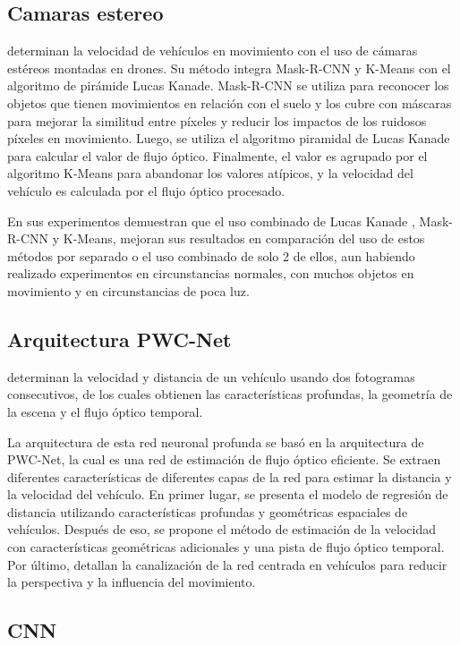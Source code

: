 \subsection{Camaras estereo}

\cite{peng2019Improved} determinan la velocidad de vehículos en movimiento con el uso de cámaras estéreos montadas en drones. Su método integra Mask-R-CNN  y K-Means con el algoritmo de pirámide Lucas Kanade. Mask-R-CNN se utiliza para reconocer los objetos que tienen movimientos en relación con el suelo y los cubre con máscaras para mejorar la similitud entre píxeles y reducir los impactos de los ruidosos píxeles en movimiento. Luego, se utiliza el algoritmo piramidal de Lucas Kanade para calcular el valor de flujo óptico. Finalmente, el valor es agrupado por el algoritmo K-Means para abandonar los valores atípicos, y la velocidad del vehículo es calculada por el flujo óptico procesado.

En sus experimentos demuestran que el uso combinado de Lucas Kanade , Mask-R-CNN y K-Means, mejoran sus resultados en comparación del uso de estos métodos por separado o el uso combinado de solo 2 de ellos, aun habiendo realizado experimentos en circunstancias normales, con muchos objetos en movimiento y en circunstancias de poca luz.

\subsection{Arquitectura PWC-Net}

\cite{song2020Learning} determinan la velocidad y distancia de un vehículo usando dos fotogramas consecutivos, de los cuales obtienen las  características profundas, la geometría de la escena y el flujo óptico temporal.

La arquitectura de esta red neuronal profunda se basó en la arquitectura de PWC-Net, la cual es una red de estimación de flujo óptico eficiente. Se extraen diferentes características de diferentes capas de la red para estimar la distancia y la velocidad del vehículo. En primer lugar, se presenta el modelo de regresión de distancia utilizando características profundas y geométricas espaciales de vehículos. Después de eso, se propone el método de estimación de la velocidad con características geométricas adicionales y una pista de flujo óptico temporal. Por último, detallan la canalización de la red centrada en vehículos para reducir la perspectiva y la influencia del movimiento.

\subsection{CNN}

